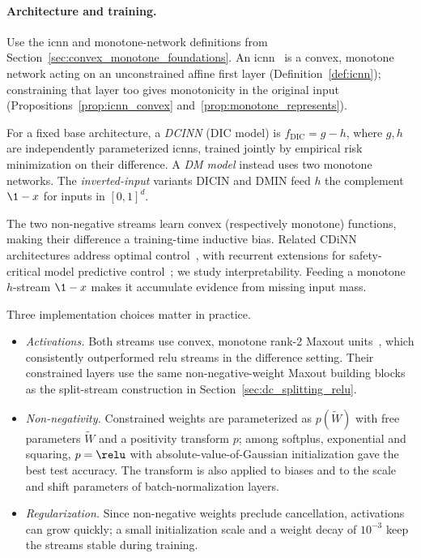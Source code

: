 \paragraph{Architecture and training.}\label{subsec:dcinn_architecture}

Use the \ac{icnn} and monotone-network definitions from Section~\ref{sec:convex_monotone_foundations}. An \ac{icnn}~\parencite{Amos2017} is a convex, monotone network acting on an unconstrained affine first layer (Definition~\ref{def:icnn}); constraining that layer too gives monotonicity in the original input (Propositions~\ref{prop:icnn_convex} and~\ref{prop:monotone_represents}).

\begin{definition}\label{def:dcinn}
For a fixed base architecture, a \emph{DCINN} (DIC model) is $f_{\mathrm{DIC}}=g-h$, where $g,h$ are independently parameterized \acp{icnn}, trained jointly by empirical risk minimization on their difference. A \emph{DM model} instead uses two monotone networks. The \emph{inverted-input} variants DICIN and DMIN feed $h$ the complement $\1-x$ for inputs in $[0,1]^d$.
\end{definition}

The two non-negative streams learn convex (respectively monotone) functions, making their difference a training-time inductive bias. Related CDiNN architectures address optimal control~\parencite{Sankaranarayanan2021CDINN}, with recurrent extensions for safety-critical model predictive control~\parencite{Chen2025_RCDiNN}; we study interpretability. Feeding a monotone $h$-stream $\1-x$ makes it accumulate evidence from missing input mass.

Three implementation choices matter in practice.
\begin{itemize}
	\item \emph{Activations.} Both streams use convex, monotone rank-2 Maxout units~\parencite{Goodfellow2013Maxout}, which consistently outperformed \ac{relu} streams in the difference setting. Their constrained layers use the same non-negative-weight Maxout building blocks as the split-stream construction in Section~\ref{sec:dc_splitting_relu}.
	\item \emph{Non-negativity.} Constrained weights are parameterized as $p(\tilde{W})$ with free parameters $\tilde{W}$ and a positivity transform $p$; among softplus, exponential and squaring, $p = \relu$ with absolute-value-of-Gaussian initialization gave the best test accuracy. The transform is also applied to biases and to the scale and shift parameters of batch-normalization layers.
	\item \emph{Regularization.} Since non-negative weights preclude cancellation, activations can grow quickly; a small initialization scale and a weight decay of $10^{-3}$ keep the streams stable during training.
\end{itemize}


